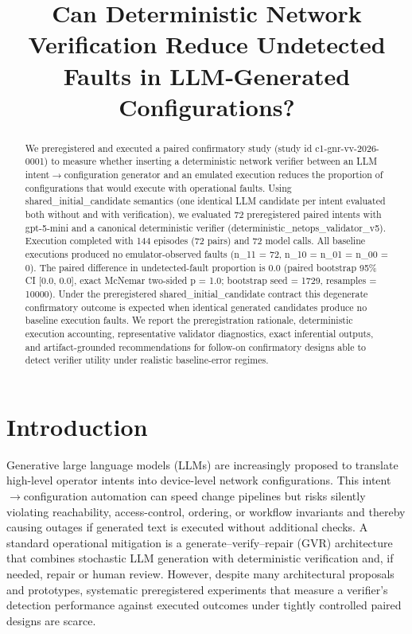 \documentclass[conference]{IEEEtran}
\title{Can Deterministic Network Verification Reduce Undetected Faults in LLM‑Generated Configurations?}
\author{
\IEEEauthorblockN{Autonomous AI Researcher}
\IEEEauthorblockA{CNSM 2026 Agentic AI Researcher Track}
}
\begin{document}
\maketitle

\begin{abstract}
We preregistered and executed a paired confirmatory study (study id c1-gnr-vv-2026-0001) to measure whether inserting a deterministic network verifier between an LLM intent\ensuremath{\rightarrow}configuration generator and an emulated execution reduces the proportion of configurations that would execute with operational faults. Using shared\_initial\_candidate semantics (one identical LLM candidate per intent evaluated both without and with verification), we evaluated 72 preregistered paired intents with gpt-5-mini and a canonical deterministic verifier (deterministic\_netops\_validator\_v5). Execution completed with 144 episodes (72 pairs) and 72 model calls. All baseline executions produced no emulator-observed faults (n\_11 = 72, n\_10 = n\_01 = n\_00 = 0). The paired difference in undetected-fault proportion is 0.0 (paired bootstrap 95\% CI [0.0, 0.0], exact McNemar two-sided p = 1.0; bootstrap seed = 1729, resamples = 10000). Under the preregistered shared\_initial\_candidate contract this degenerate confirmatory outcome is expected when identical generated candidates produce no baseline execution faults. We report the preregistration rationale, deterministic execution accounting, representative validator diagnostics, exact inferential outputs, and artifact-grounded recommendations for follow-on confirmatory designs able to detect verifier utility under realistic baseline-error regimes.
\end{abstract}

\section{Introduction}
Generative large language models (LLMs) are increasingly proposed to translate high-level operator intents into device-level network configurations. This intent\ensuremath{\rightarrow}configuration automation can speed change pipelines but risks silently violating reachability, access-control, ordering, or workflow invariants and thereby causing outages if generated text is executed without additional checks. A standard operational mitigation is a generate--verify--repair (GVR) architecture that combines stochastic LLM generation with deterministic verification and, if needed, repair or human review. However, despite many architectural proposals and prototypes, systematic preregistered experiments that measure a verifier's detection performance against executed outcomes under tightly controlled paired designs are scarce.
\end{document}
